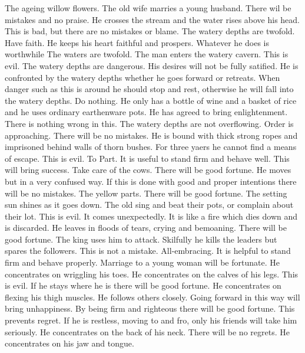 	{The ageing willow flowers. The old wife marries a young husband. There wil be mistakes and no praise.}
	{He crosses the stream and the water rises above his head. This is bad, but there are no mistakes or blame.}
\or {}
	{The watery depths are twofold. Have faith. He keeps his heart faithful and prospers. Whatever he does is
		worthwhile}
	{The waters are twofold. The man enters the watery cavern. This is evil.}
	{The watery depths are dangerous. His desires will not be fully satified.}
	{He is confronted by the watery depths whether he goes forward or retreats. When danger such as this is
		around he should stop and rest, otherwise he will fall into the watery depths. Do nothing.}
	{He only has a bottle of wine and a basket of rice and he uses ordinary earthenware pots. He has agreed
		to bring enlightenment. There is nothing wrong in this.}
	{The watery depths are not overflowing. Order is approaching. There will be no mistakes.}
	{He is bound with thick strong ropes and imprisoned behind walls of thorn bushes. For three yaers he cannot
		find a means of escape. This is evil.}
\or {}
	{To Part. It is useful to stand firm and behave well. This will bring success. Take care of the cows. There
		will be good fortune.}
	{He moves but in a very confused way. If this is done with good and proper intentions there will be no mistakes.}
	{The yellow parts. There will be good fortune.}
	{The setting sun shines as it goes down. The old sing and beat their pots, or complain about their lot.
		This is evil.}
	{It comes unexpectedly. It is like a fire which dies down and is discarded.}
	{He leaves in floods of tears, crying and bemoaning. There will be good fortune.}
	{The king uses him to attack. Skilfully he kills the leaders but spares the followers. This is not a mistake.}
\or {}
	{All-embracing. It is helpful to stand firm and behave properly. Marriage to a young woman will be fortunate.}
	{He concentrates on wriggling his toes.}
	{He concentrates on the calves of his legs. This is evil. If he stays where he is there will be good fortune.}
	{He concentrates on flexing his thigh muscles. He follows others closely. Going forward in this way will
		bring unhappiness.}
	{By being firm and righteous there will be good fortune. This prevents regret. If he is restless, moving to
		and fro, only his friends will take him seriously.}
	{He concentrates on the back of his neck. There will be no regrets.}
	{He concentrates on his jaw and tongue.}
\or {}
